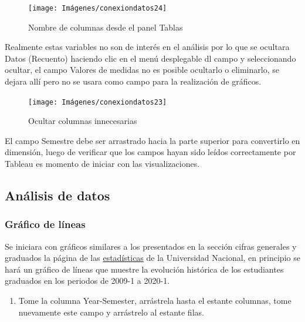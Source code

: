 \documentclass[
]{book}
\providecommand{\tightlist}{%
  \setlength{\itemsep}{0pt}\setlength{\parskip}{0pt}}
\begin{document}
\begin{figure}

{\centering \texttt{[image: Imágenes/conexiondatos24]} 

}

\caption{Nombre de columnas desde el panel Tablas}\label{fig:tablas-fig}
\end{figure}

Realmente estas variables no son de interés en el análisis por lo que se ocultara Datos (Recuento) haciendo clic en el menú desplegable dl campo y seleccionando ocultar, el campo Valores de medidas no es posible ocultarlo o eliminarlo, se dejara allí pero no se usara como campo para la realización de gráficos.

\begin{figure}

{\centering \texttt{[image: Imágenes/conexiondatos23]} 

}

\caption{Ocultar columnas innecesarias}\label{fig:ocultarcolumnas-fig}
\end{figure}

El campo Semestre debe ser arrastrado hacia la parte superior para convertirlo en dimensión, luego de verificar que los campos hayan sido leídos correctamente por Tableau es momento de iniciar con las visualizaciones.

\hypertarget{analisisdedatos}{%
\subsection{Análisis de datos}\label{analisisdedatos}}

\hypertarget{graficodelineas}{%
\subsubsection{Gráfico de líneas}\label{graficodelineas}}

Se iniciara con gráficos similares a los presentados en la sección cifras generales y graduados la página de las \href{http://estadisticas.unal.edu.co/home/}{estadísticas} de la Universidad Nacional, en principio se hará un gráfico de líneas que muestre la evolución histórica de los estudiantes graduados en los periodos de 2009-1 a 2020-1.

\begin{enumerate}
\def\labelenumi{\arabic{enumi}.}
\tightlist
\item
  Tome la columna Year-Semester, arrástrela hasta el estante columnas, tome nuevamente este campo y arrástrelo al estante filas.
\end{enumerate}
\end{document}
